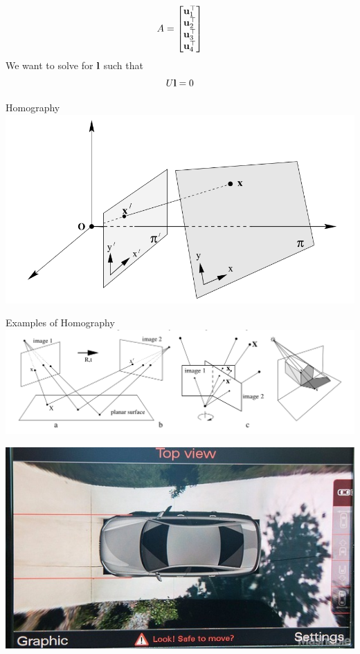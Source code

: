 \documentclass[times,t]{beamer}
\begin{document}
\begin{frame}
  \[
    A = \begin{bmatrix}\mathbf{u}_1^\top  \\
      \mathbf{u}_2^\top \\
      \mathbf{u}_3^\top \\
      \mathbf{u}_4^\top
    \end{bmatrix}
  \]
  We want to solve for $\mathbf{l}$ such that
  \[
    U \mathbf{l} = 0
  \]
\end{frame}


\begin{frame}{Homography}
  \includegraphics[width=\linewidth]{media/homography-maps-a-line-to-a-line.png}
\end{frame}
\begin{frame}{Examples  of  Homography}
  \includegraphics[width=\linewidth]{media/examples-of-homography.png}
\end{frame}

\begin{frame}
  \includegraphics[width=0.60\linewidth]{media/audi top view camera.jpg}
\end{frame}
\end{document}
